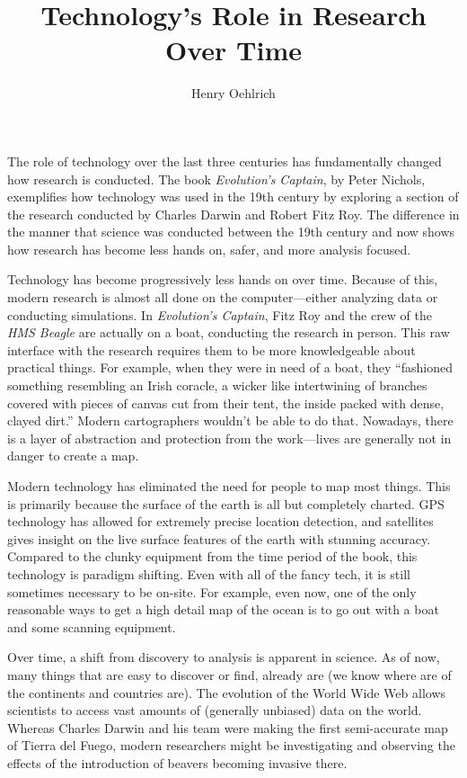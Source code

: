 \documentclass{article}
\title{Technology's Role in Research Over Time}
\author{Henry Oehlrich}
\begin{document}
\maketitle{}

The role of technology over the last three centuries has fundamentally changed
how research is conducted. The book \textit{Evolution's Captain}, by Peter
Nichols, exemplifies how technology was used in the 19th century by exploring a
section of the research conducted by Charles Darwin and Robert Fitz Roy. The 
difference in the manner that science was conducted between the 19th century
and now shows how research has become less hands on, safer, and more analysis
focused.

Technology has become progressively less hands on over time. Because of this,
modern research is almost all done on the computer—either analyzing data or
conducting simulations. In \textit{Evolution's Captain}, Fitz Roy and the crew
of the \textit{HMS Beagle} are actually on a boat, conducting the research in
person. This raw interface with the research requires them to be more
knowledgeable about practical things. For example, when they were in need of a
boat, they ``fashioned something resembling an Irish coracle, a wicker like
intertwining of branches covered with pieces of canvas cut from their tent, the
inside packed with dense, clayed dirt.'' Modern cartographers wouldn't be able
to do that. Nowadays, there is a layer of abstraction and protection from the
work—lives are generally not in danger to create a map.

Modern technology has eliminated the need for people to map most things. This
is primarily because the surface of the earth is all but completely charted.
GPS technology has allowed for extremely precise location detection, and
satellites gives insight on the live surface features of the earth with stunning
accuracy. Compared to the clunky equipment from the time period of the book,
this technology is paradigm shifting. Even with all of the fancy tech, it is
still sometimes necessary to be on-site. For example, even now, one of the only
reasonable ways to get a high detail map of the ocean is to go out with a boat
and some scanning equipment.

Over time, a shift from discovery to analysis is apparent in science. As of now,
many things that are easy to discover or find, already are (we know where are of
the continents and countries are). The evolution of the World Wide Web allows
scientists to access vast amounts of (generally unbiased) data on the world.
Whereas Charles Darwin and his team were making the first semi-accurate map of
Tierra del Fuego, modern researchers might be investigating and observing the
effects of the introduction of beavers becoming invasive there.
\end{document}
